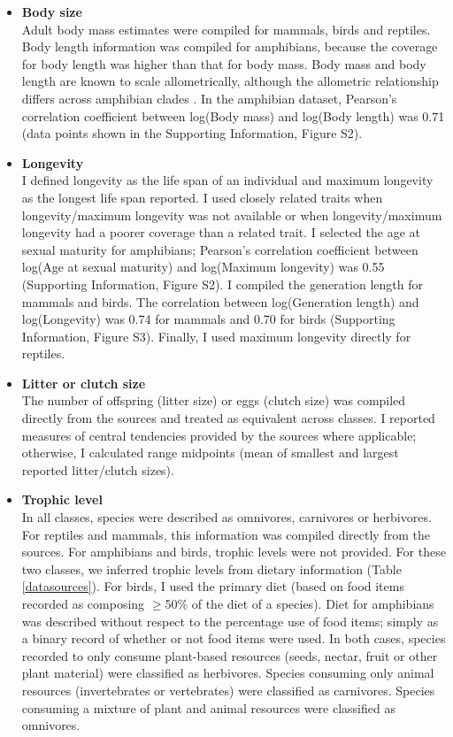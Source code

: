 \begin{itemize}
\item \textbf{Body size}\\
Adult body mass estimates were compiled for mammals, birds and reptiles. Body length information was compiled for amphibians, because the coverage for body length was higher than that for body mass. Body mass and body length are known to scale allometrically, although the allometric relationship differs across amphibian clades \citep{Santini2018}. In the amphibian dataset, Pearson’s correlation coefficient between log(Body mass) and log(Body length) was 0.71 (data points shown in the Supporting Information, Figure S2).
 
\item \textbf{Longevity}\\
I defined longevity as the life span of an individual and maximum longevity as the longest life span reported. I used closely related traits when longevity/maximum longevity was not available or when longevity/maximum longevity had a poorer coverage than a related trait. I selected the age at sexual maturity for amphibians; Pearson’s correlation coefficient between log(Age at sexual maturity) and log(Maximum longevity) was 0.55 (Supporting Information, Figure S2). I compiled the generation length for mammals and birds. The correlation between log(Generation length) and log(Longevity) was 0.74 for mammals and 0.70 for birds (Supporting Information, Figure S3). Finally, I used maximum longevity directly for reptiles.

\item \textbf{Litter or clutch size}\\
The number of offspring (litter size) or eggs (clutch size) was compiled directly from the sources and treated as equivalent across classes. I reported measures of central tendencies provided by the sources where applicable; otherwise, I calculated range midpoints (mean of smallest and largest reported litter/clutch sizes).

\item \textbf{Trophic level}\\
In all classes, species were described as omnivores, carnivores or herbivores. For reptiles and mammals, this information was compiled directly from the sources. For amphibians and birds, trophic levels were not provided. For these two classes, we inferred trophic levels from dietary information (Table \ref{datasources}). For birds, I used the primary diet (based on food items recorded as composing $\geq$50\% of the diet of a species). Diet for amphibians was described without respect to the percentage use of food items; simply as a binary record of whether or not food items were used. In both cases, species recorded to only consume plant-based resources (seeds, nectar, fruit or other plant material) were classified as herbivores. Species consuming only animal resources (invertebrates or vertebrates) were classified as carnivores. Species consuming a mixture of plant and animal resources were classified as omnivores.


\end{itemize}
